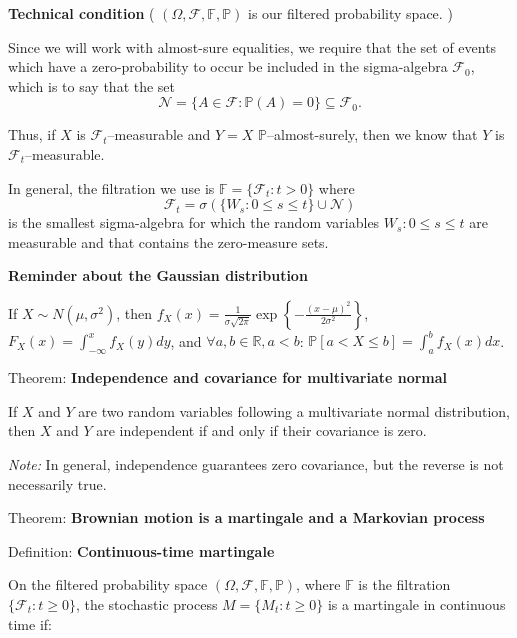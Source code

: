 \documentclass[12pt,a4paper]{article}
\begin{document}
\textbf{Technical condition} ( $(\Omega, \mathcal{F}, \mathbb{F}, \mathbb{P})$ is our filtered probability space.
)

Since we will work with almost-sure equalities, we require that the set of events which have a zero-probability to occur be included in the sigma-algebra $\mathcal{F}_0$, which is to say that the set
\[
\mathcal{N} = \{A \in \mathcal{F} : \mathbb{P}(A) = 0\} \subseteq \mathcal{F}_0.
\]

Thus, if $X$ is $\mathcal{F}_t$--measurable and $Y = X$ $\mathbb{P}$--almost-surely, then we know that $Y$ is $\mathcal{F}_t$--measurable.
\vspace{1em}

In general, the filtration we use is $\mathbb{F} = \{\mathcal{F}_t : t > 0\}$ where
\[
\mathcal{F}_t = \sigma(\{W_s : 0 \leq s \leq t\} \cup \mathcal{N})
\]
is the smallest sigma-algebra for which the random variables $W_s : 0 \leq s \leq t$ are measurable and that contains the zero-measure sets.
\vspace{1em}

\textbf{Reminder about the Gaussian distribution}

If $X \sim N(\mu, \sigma^2)$, then $f_X(x) = \frac{1}{\sigma\sqrt{2\pi}} \exp\left\{-\frac{(x-\mu)^2}{2\sigma^2}\right\}$, $F_X(x) = \int_{-\infty}^{x} f_X(y) dy$, and $\forall a, b \in \mathbb{R}, a < b$: $\mathbb{P}[a < X \leq b] = \int_a^b f_X(x) dx$.
\vspace{1em}

Theorem: \textbf{Independence and covariance for multivariate normal}
\vspace{0.5em}

If $X$ and $Y$ are two random variables following a multivariate normal distribution, then $X$ and $Y$ are independent if and only if their covariance is zero.
\vspace{1em}

\textit{Note:} In general, independence guarantees zero covariance, but the reverse is not necessarily true.
\vspace{1em}

Theorem: \textbf{Brownian motion is a martingale and a Markovian process}
\vspace{1em}

Definition: \textbf{Continuous-time martingale}
\vspace{0.5em}

On the filtered probability space $(\Omega, \mathcal{F}, \mathbb{F}, \mathbb{P})$, where $\mathbb{F}$ is the filtration $\{\mathcal{F}_t : t \geq 0\}$, the stochastic process $M = \{M_t : t \geq 0\}$ is a martingale in continuous time if:
\end{document}
